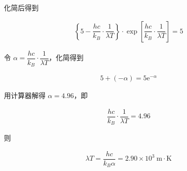 \documentclass{article}
\newcommand*{\me}{\mathrm{e}}
\newcommand{\si}[1]{\  \mathrm{#1}}
\begin{document}
化简后得到

\begin{equation*}
  \begin{aligned}
    \left\{ 5 - \dfrac{hc}{k_B} \cdot \dfrac{1}{\lambda T}   \right\} \cdot \exp \left[ \dfrac{hc}{k_B} \cdot \dfrac{1}{\lambda T}   \right] = 5
  \end{aligned}
\end{equation*}

令 $\alpha = \dfrac{hc}{k_B} \cdot \dfrac{1}{\lambda T}  $，化简得到

\begin{equation*}
  \begin{aligned}
    5 + \left( - \alpha \right) = 5 \me^{-\alpha}
  \end{aligned}
\end{equation*}

用计算器解得 $\alpha = 4.96$，即

\begin{equation*}
  \begin{aligned}
    \dfrac{hc}{k_B} \cdot \dfrac{1}{\lambda T} = 4.96  
  \end{aligned}
\end{equation*}

则

\begin{equation*}
  \begin{aligned}
    \lambda T = \dfrac{h c}{k_B \alpha} = 2.90 \times 10^3 \si{m \cdot K} 
  \end{aligned}
\end{equation*}
\end{document}
